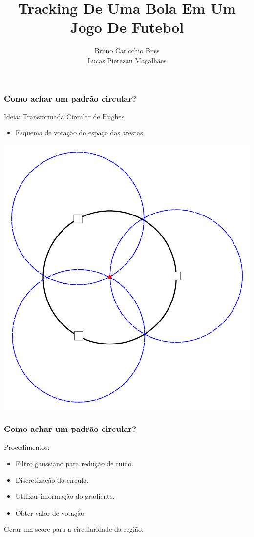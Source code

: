 \documentclass{beamer}
\author[]{Bruno Caricchio Buss\\Lucas Pierezan Magalhães}
\institute[COS756 - UFRJ]{Universidade Federal do Rio de Janeiro}
\title[Tracking De Uma Bola]{Tracking De Uma Bola Em Um Jogo De Futebol}
\begin{document}
\begin{frame}
\titlepage
\end{frame}

\begin{frame}
\frametitle{Como achar um padrão circular?}

\vfill
Ideia: Transformada Circular de Hughes

\begin{itemize}
\item Esquema de votação do espaço das arestas.
\end{itemize}

\vfill

\begin{center}
\includegraphics[scale=0.2,keepaspectratio=true]{circulos_Hughes.pdf}
\end{center}

\vfill

\end{frame}


\begin{frame}
\frametitle{Como achar um padrão circular?}

\vfill

Procedimentos:
\begin{itemize}
\item Filtro gaussiano para redução de ruído.
\item Discretização do círculo.
\item Utilizar informação do gradiente.
\item Obter valor de votação.
\end{itemize}

\vfill

Gerar um score para a circularidade da região.

\vfill

\end{frame}
\end{document}
